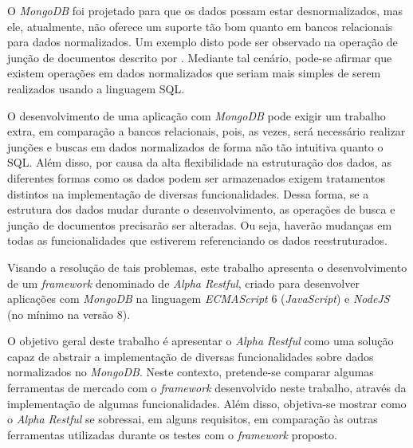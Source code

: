 O \textit{MongoDB} foi projetado para que os dados possam estar desnormalizados, mas ele, atualmente, não oferece um suporte tão bom quanto em bancos relacionais para dados normalizados. Um exemplo disto pode ser observado na operação de junção de documentos descrito por . Mediante tal cenário, pode-se afirmar que existem operações em dados normalizados que seriam mais simples de serem realizados usando a linguagem SQL.


O desenvolvimento de uma aplicação com \textit{MongoDB} pode exigir um trabalho extra, em comparação a bancos relacionais, pois, as vezes, será necessário realizar junções e buscas em dados normalizados de forma não tão intuitiva quanto o SQL. Além disso, por causa da alta flexibilidade na estruturação dos dados, as diferentes formas como os dados podem ser armazenados exigem tratamentos distintos na implementação de diversas funcionalidades. Dessa forma, se a estrutura dos dados mudar durante o desenvolvimento, as operações de busca e junção de documentos precisarão ser alteradas. Ou seja, haverão mudanças em todas as funcionalidades que estiverem referenciando os dados reestruturados.


Visando a resolução de tais problemas, este trabalho apresenta o desenvolvimento de um \textit{framework} denominado de \textit{Alpha Restful}, criado para desenvolver aplicações com \textit{MongoDB} na linguagem \textit{ECMAScript} 6 (\textit{JavaScript}) e \textit{NodeJS} (no mínimo na versão 8).


O objetivo geral deste trabalho é apresentar o \textit{Alpha Restful} como uma solução capaz de abstrair a implementação de diversas funcionalidades sobre dados normalizados no \textit{MongoDB}. Neste contexto, pretende-se comparar algumas ferramentas de mercado com o \textit{framework} desenvolvido neste trabalho, através da implementação de algumas funcionalidades. Além disso, objetiva-se mostrar como o \textit{Alpha Restful}
se sobressai, em alguns requisitos, em comparação às outras ferramentas utilizadas durante os testes com o \textit{framework} proposto.

